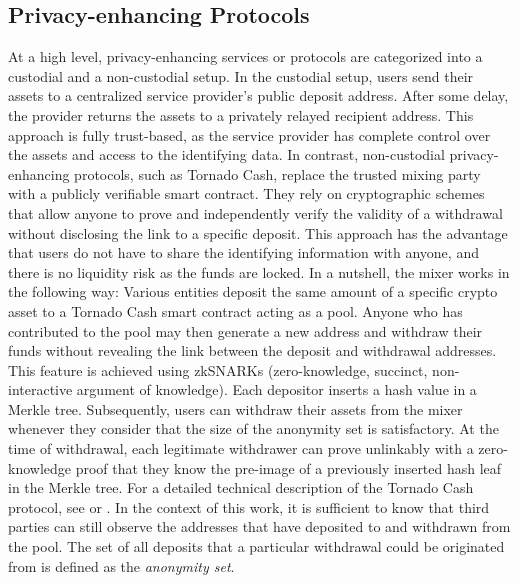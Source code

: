 \documentclass[12pt,a4paper,titlepage,oneside,english]{article}
\begin{document}
\subsection{Privacy-enhancing Protocols}
At a high level, privacy-enhancing services or protocols are categorized into a custodial and a non-custodial setup. In the custodial setup, users send their assets to a centralized service provider's public deposit address. After some delay, the provider returns the assets to a privately relayed recipient address. This approach is fully trust-based, as the service provider has complete control over the assets and access to the identifying data. \citep{Beres2020, wu2022tutela, nadler2023tornado} \newline 
In contrast, non-custodial privacy-enhancing protocols, such as Tornado Cash, replace the trusted mixing party with a publicly verifiable smart contract. They rely on cryptographic schemes that allow anyone to prove and independently verify the validity of a withdrawal without disclosing the link to a specific deposit. This approach has the advantage that users do not have to share the identifying information with anyone, and there is no liquidity risk as the funds are locked. \citep{nadler2023tornado} \newline
In a nutshell, the mixer works in the following way: Various entities deposit the same amount of a specific crypto asset to a Tornado Cash smart contract acting as a pool. Anyone who has contributed to the pool may then generate a new address and withdraw their funds without revealing the link between the deposit and withdrawal addresses. This feature is achieved using zkSNARKs (zero-knowledge, succinct, non-interactive argument of knowledge). 
Each depositor inserts a hash value in a Merkle tree. Subsequently, users can withdraw their assets from the mixer whenever they consider that the size of the anonymity set is satisfactory.
 At the time of withdrawal, each legitimate withdrawer can prove unlinkably with a zero-knowledge proof that they know the pre-image of a previously inserted hash leaf in the Merkle tree. For a detailed technical description of the Tornado Cash protocol, see \cite{khovratovich2019tornado} or \cite{pertsev2019tornado}.
\newline
In the context of this work, it is sufficient to know that third parties can still observe the addresses that have deposited to and withdrawn from the pool. The set of all deposits that a particular withdrawal could be originated from is defined as the \textit{anonymity set}. 
\end{document}
